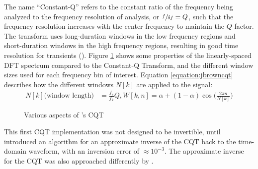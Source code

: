 \documentclass[report.tex]{subfiles}
\begin{document}
The name ``Constant-Q'' refers to the constant ratio of the frequency being analyzed to the frequency resolution of analysis, or $\sfrac{f}{\delta f} = Q$, such that the frequency resolution increases with the center frequency to maintain the $Q$ factor. The transform uses long-duration windows in the low frequency regions and short-duration windows in the high frequency regions, resulting in good time resolution for transients (\cite{cqtransient}). Figure \ref{fig:jbrowncqt} shows some properties of the linearly-spaced DFT spectrum compared to the Constant-Q Transform, and the different window sizes used for each frequency bin of interest. Equation \ref{equation:jbrowncqt} describes how the different windows $N[k]$ are applied to the signal:
\begin{align}\tag{9}\label{equation:jbrowncqt}
	\nonumber N[k] \text{(window length)} &= \frac{f_{s}}{f_{k}}Q, W[k, n] = \alpha + (1 - \alpha)\cos\big(\frac{2\pi n}{N[k]}\big)
\end{align}

\begin{figure}[ht]
	\centering
	\hspace{0.5em}
	\caption{Various aspects of \textcite{jbrown}'s CQT}
	\label{fig:jbrowncqt}
\end{figure}

This first CQT implementation was not designed to be invertible, until \textcite{klapuricqt} introduced an algorithm for an approximate inverse of the CQT back to the time-domain waveform, with an inversion error of $\approx 10^{-3}$. The approximate inverse for the CQT was also approached differently by \textcite{fitzgeraldcqt}.
\end{document}
